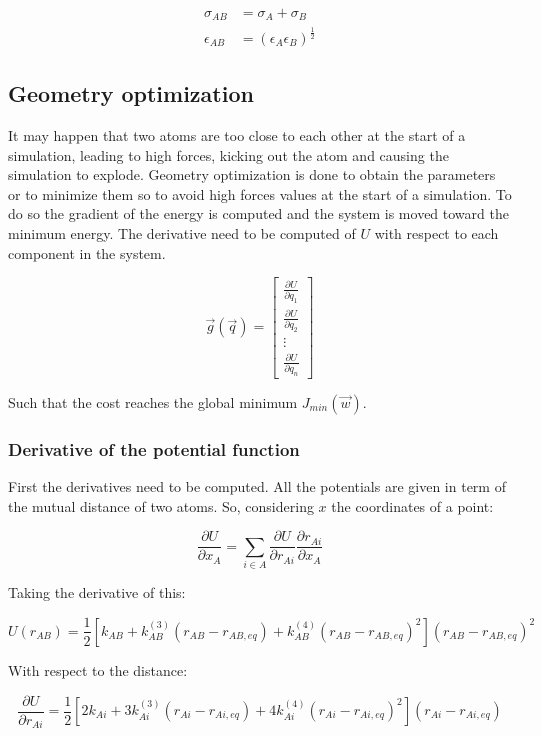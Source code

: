	\begin{align*}
		\sigma_{AB} &= \sigma_A+\sigma_B\\
		\epsilon_{AB} &= (\epsilon_A\epsilon_B)^{\frac{1}{2}}
	\end{align*}

	\subsection{Geometry optimization}
	It may happen that two atoms are too close to each other at the start of a simulation, leading to high forces, kicking out the atom and causing the simulation to explode.
	Geometry optimization is done to obtain the parameters or to minimize them so to avoid high forces values at the start of a simulation.
	To do so the gradient of the energy is computed and the system is moved toward the minimum energy.
	The derivative need to be computed of $U$ with respect to each component in the system.

	$$\vec{g}(\vec{q}) = \begin{bmatrix} \frac{\partial U}{\partial q_1} \\ \frac{\partial U}{\partial q_2} \\ \vdots \\ \frac{\partial U}{\partial q_n}\end{bmatrix}$$

	Such that the cost reaches the global minimum $J_{min}(\vec{w})$.

		\subsubsection{Derivative of the potential function}
		First the derivatives need to be computed.
		All the potentials are given in term of the mutual distance of two atoms.
		So, considering $x$ the coordinates of a point:

		$$\frac{\partial U}{\partial x_A} = \sum\limits_{i\in A}\frac{\partial U}{\partial r_{Ai}}\frac{\partial r_{Ai}}{\partial x_A}$$

		Taking the derivative of this:

		$$U(r_{AB}) = \frac{1}{2}[k_{AB}+k_{AB}^{(3)}(r_{AB}-r_{AB, eq}) + k_{AB}^{(4)}(r_{AB}-r_{AB, eq})^2](r_{AB}-r_{AB,eq})^2$$

		With respect to the distance:

		$$\frac{\partial U}{\partial r_{Ai}} = \frac{1}{2}[2k_{Ai}+3k_{Ai}^{(3)}(r_{Ai}-r_{Ai, eq}) + 4k^{(4)}_{Ai}(r_{Ai}-r_{Ai, eq})^2](r_{Ai}-r_{Ai, eq})$$

